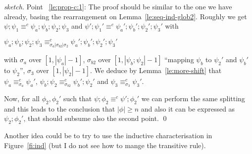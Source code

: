 \documentclass{llncs}
\newcommand{\interval}[2][1]{\ensuremath{[{#1},{#2}]}}
\newcommand{\perm}{\sigma}
\begin{document}
\begin{proof}[sketch]  
  Point ~\ref{le:prop-c:1}: The proof should be similar to the one we have already, basing the rearrangement on Lemma~\ref{le:seq-ind-glob2}. Roughly we get $\psi;\psi_1 \equiv^c \psi_a;\psi_b;\psi_{2};\psi_{3}$ and
  $\psi';\psi_1' \equiv^c \psi_a';\psi_b';\psi_{2}';\psi_{3}'$
  with
  \begin{center}
    $\psi_a;\psi_b;\psi_{2};\psi_{3}
    \equiv^c_{\perm_a|\perm_{b2}|\perm_2}
    \psi_a';\psi_b';\psi_{2}';\psi_{3}'$
  \end{center}
  with $\perm_a$ over $\interval{|\psi_a|-1}$, $\perm_{b2}$ over
  $\interval{|\psi_b;\psi_{2}|-1}$ ``mapping $\psi_b$ to $\psi_{2}'$
  and $\psi_b'$ to $\psi_{2}$'', $\perm_3$ over
  $\interval{|\psi_2|-1}$.  We deduce by Lemma~\ref{le:more-shift}
  that $\psi_a \equiv^c_{\perm_a} \psi_a'$,
  $\psi_b;\psi_{2} \equiv^c_{\perm_{b2}} \psi_b';\psi_{2}'$ and
  $\psi_{3} \equiv^c_{\perm_3} \psi_{3}'$.
  
  Now, for all $\phi_2, \phi_2'$ such that
  $\psi;\phi_2 \equiv^c \psi';\phi_2'$ we can perform the same
  splitting and this leads to the conclusion that $|\phi| \geq n$ and
  also it can be expressed as $\psi_2;\phi_2'$, that should subsume
  also the second point.
\qed
\end{proof}


Another idea could be to try to use the inductive characterisation in Figure~\ref{fi:ind} (but I do not see how to mange the transitive rule).
\end{document}
